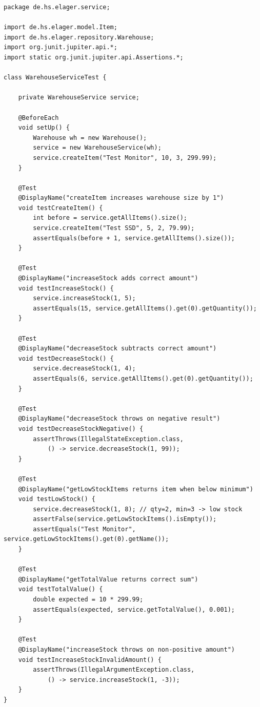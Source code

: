 \documentclass[12pt, a4paper, twoside]{report}
\begin{document}
\begin{lstlisting}[caption={WarehouseServiceTest.java -- JUnit-5-Tests}, label={lst:tests}]
package de.hs.elager.service;

import de.hs.elager.model.Item;
import de.hs.elager.repository.Warehouse;
import org.junit.jupiter.api.*;
import static org.junit.jupiter.api.Assertions.*;

class WarehouseServiceTest {

    private WarehouseService service;

    @BeforeEach
    void setUp() {
        Warehouse wh = new Warehouse();
        service = new WarehouseService(wh);
        service.createItem("Test Monitor", 10, 3, 299.99);
    }

    @Test
    @DisplayName("createItem increases warehouse size by 1")
    void testCreateItem() {
        int before = service.getAllItems().size();
        service.createItem("Test SSD", 5, 2, 79.99);
        assertEquals(before + 1, service.getAllItems().size());
    }

    @Test
    @DisplayName("increaseStock adds correct amount")
    void testIncreaseStock() {
        service.increaseStock(1, 5);
        assertEquals(15, service.getAllItems().get(0).getQuantity());
    }

    @Test
    @DisplayName("decreaseStock subtracts correct amount")
    void testDecreaseStock() {
        service.decreaseStock(1, 4);
        assertEquals(6, service.getAllItems().get(0).getQuantity());
    }

    @Test
    @DisplayName("decreaseStock throws on negative result")
    void testDecreaseStockNegative() {
        assertThrows(IllegalStateException.class,
            () -> service.decreaseStock(1, 99));
    }

    @Test
    @DisplayName("getLowStockItems returns item when below minimum")
    void testLowStock() {
        service.decreaseStock(1, 8); // qty=2, min=3 -> low stock
        assertFalse(service.getLowStockItems().isEmpty());
        assertEquals("Test Monitor", service.getLowStockItems().get(0).getName());
    }

    @Test
    @DisplayName("getTotalValue returns correct sum")
    void testTotalValue() {
        double expected = 10 * 299.99;
        assertEquals(expected, service.getTotalValue(), 0.001);
    }

    @Test
    @DisplayName("increaseStock throws on non-positive amount")
    void testIncreaseStockInvalidAmount() {
        assertThrows(IllegalArgumentException.class,
            () -> service.increaseStock(1, -3));
    }
}
\end{lstlisting}
\end{document}
